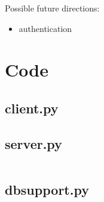 \documentclass[a4paper,12pt]{article}
\begin{document}
Possible future directions:
\begin{itemize}
 \item authentication
\end{itemize}


\section{Code}

\subsection{client.py}
\begin{alltt}

\end{alltt}

\subsection{server.py}
\begin{verbatim}

\end{verbatim}

\subsection{dbsupport.py}
\begin{alltt}

\end{alltt}





% 
% 
% 
% 
% 
% 
\end{document}
